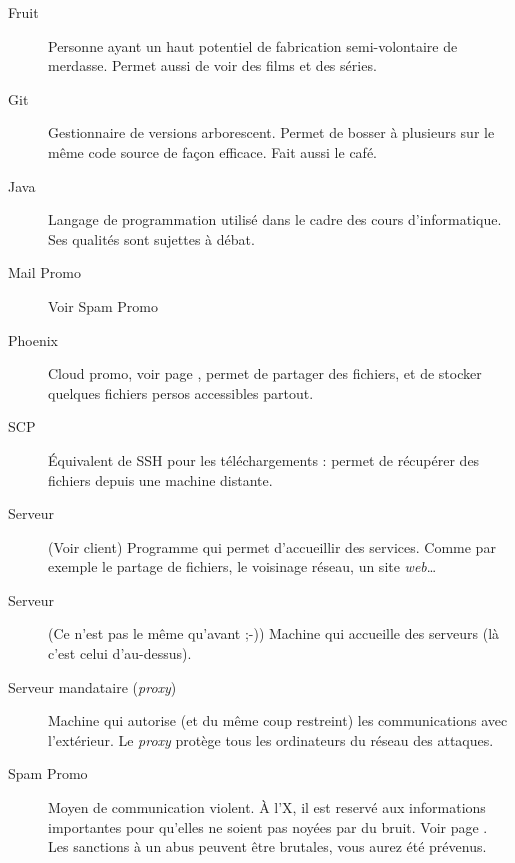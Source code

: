 \begin{description}
  \item[Fruit] Personne ayant un haut potentiel de fabrication semi-volontaire de merdasse. Permet aussi de voir des films et des séries.

  \item[Git] Gestionnaire de versions arborescent. Permet de bosser à plusieurs sur le même code source de façon efficace. Fait aussi le café.
  

  
   \item[Java] Langage de programmation utilisé dans le cadre des cours d'informatique. Ses qualités sont sujettes à débat.
   
   \item[Mail Promo] Voir Spam Promo
   
  \item[Phoenix] Cloud promo, voir page \pageref{phoenix}, permet de partager des fichiers, et de stocker quelques fichiers persos accessibles partout.
  
  \item[SCP] Équivalent de SSH pour les téléchargements : permet de récupérer des fichiers depuis une machine distante.
  
  \item[Serveur] (Voir client) Programme qui permet d'accueillir des services. Comme par exemple le partage de fichiers, le voisinage réseau, un site \emph{web}\ldots\
  \item[Serveur] (Ce n'est pas le même qu'avant ;-)) Machine qui accueille des serveurs (là c'est celui d'au-dessus).
  
  \item[Serveur mandataire (\emph{proxy})] Machine qui autorise
(et du même coup restreint) les communications avec l'extérieur. Le \emph{proxy} protège tous les ordinateurs du réseau des attaques.

  \item[Spam Promo] Moyen de communication violent. À l'X, il est reservé aux informations importantes pour qu'elles ne soient pas noyées par du bruit. Voir page \pageref{mails}. Les sanctions à un abus peuvent être brutales, vous aurez été prévenus.
  

\end{description}
